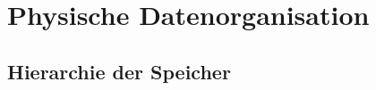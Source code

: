 \documentclass{scrartcl}
\begin{document}
%

\section{Physische Datenorganisation}

\subsection{Hierarchie der Speicher}
\end{document}
